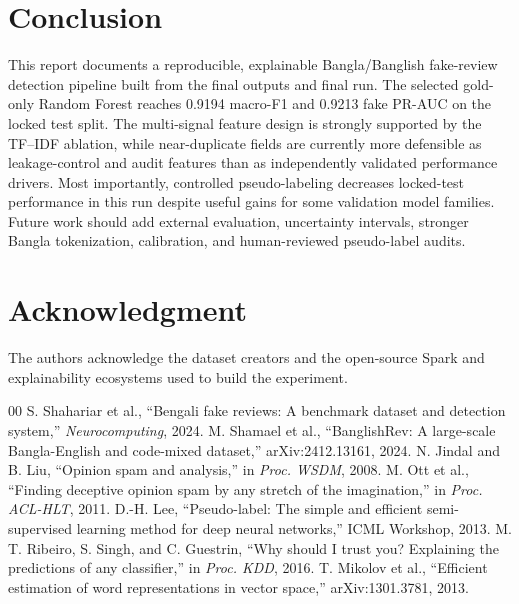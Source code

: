 \documentclass[conference]{IEEEtran}
\begin{document}
\section{Conclusion}
This report documents a reproducible, explainable Bangla/Banglish fake-review detection pipeline built from the final outputs and final run. The selected gold-only Random Forest reaches 0.9194 macro-F1 and 0.9213 fake PR-AUC on the locked test split. The multi-signal feature design is strongly supported by the TF--IDF ablation, while near-duplicate fields are currently more defensible as leakage-control and audit features than as independently validated performance drivers. Most importantly, controlled pseudo-labeling decreases locked-test performance in this run despite useful gains for some validation model families. Future work should add external evaluation, uncertainty intervals, stronger Bangla tokenization, calibration, and human-reviewed pseudo-label audits.

\section*{Acknowledgment}
The authors acknowledge the dataset creators and the open-source Spark and explainability ecosystems used to build the experiment.

\begin{thebibliography}{00}
 S. Shahariar et al., ``Bengali fake reviews: A benchmark dataset and detection system,'' \emph{Neurocomputing}, 2024.
 M. Shamael et al., ``BanglishRev: A large-scale Bangla-English and code-mixed dataset,'' arXiv:2412.13161, 2024.
 N. Jindal and B. Liu, ``Opinion spam and analysis,'' in \emph{Proc. WSDM}, 2008.
 M. Ott et al., ``Finding deceptive opinion spam by any stretch of the imagination,'' in \emph{Proc. ACL-HLT}, 2011.
 D.-H. Lee, ``Pseudo-label: The simple and efficient semi-supervised learning method for deep neural networks,'' ICML Workshop, 2013.
 M. T. Ribeiro, S. Singh, and C. Guestrin, ``Why should I trust you? Explaining the predictions of any classifier,'' in \emph{Proc. KDD}, 2016.
 T. Mikolov et al., ``Efficient estimation of word representations in vector space,'' arXiv:1301.3781, 2013.
\end{thebibliography}
\end{document}
